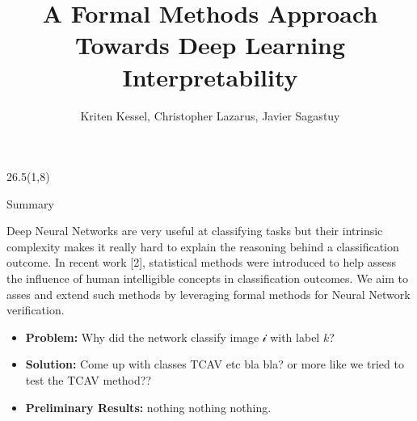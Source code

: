 \documentclass[final]{beamer}
\title{A Formal Methods Approach Towards Deep Learning Interpretability}
\author{Kriten Kessel, Christopher Lazarus, Javier Sagastuy}
\institute{Stanford University}
\begin{document}
\newcommand{\vltbl}{{\color{tbllinecolor}\vrule}}


\begin{frame}[fragile]{}

%

\newcommand{\vstart}{58} %
\newcommand{\vstartCols}{8} %
\newcommand{\fullwidth}{81}  %
\newcommand{\colwidth}{26.5}

\newcommand{\firstcolpos}{1}
\newcommand{\secondcolpos}{28.75}
\newcommand{\thirdcolpos}{56.5}
\newcommand{\bottomblockstart}{108.5}


\newenvironment{paddedBlock}[2][0.95\linewidth]
    {\begin{block}{#2}\begin{minipage}{#1}}
    {\end{minipage}\end{block}}


\begin{textblock}{\colwidth}(\firstcolpos,\vstartCols)

\begin{paddedBlock}{Summary}
Deep Neural Networks are very useful at classifying tasks but their intrinsic complexity makes it really hard to explain the reasoning behind a classification outcome. In recent work [2], statistical methods were introduced to help assess the influence of human intelligible concepts in classification outcomes.
We aim to asses and extend such methods by leveraging formal methods for Neural Network verification.
\begin{itemize}
\item \textbf{Problem:} Why did the network classify image $\mathcal{i}$ with label $k$?
\item \textbf{Solution:} Come up with classes TCAV etc bla bla? or more like we tried to test the TCAV method??
\item \textbf{Preliminary Results:} nothing nothing nothing.
\end{itemize}
\end{paddedBlock}


\end{textblock}
\end{frame}
\end{document}
